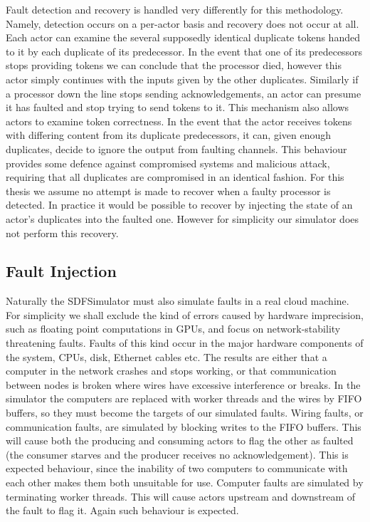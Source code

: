 Fault detection and recovery is handled very differently for this methodology.
Namely, detection occurs on a per-actor basis and recovery does not occur at all.
Each actor can examine the several supposedly identical duplicate tokens handed to it by each duplicate of its predecessor.
In the event that one of its predecessors stops providing tokens we can conclude that the processor died, however this actor simply continues with the inputs given by the other duplicates.
Similarly if a processor down the line stops sending acknowledgements, an actor can presume it has faulted and stop trying to send tokens to it.
This mechanism also allows actors to examine token correctness.
In the event that the actor receives tokens with differing content from its duplicate predecessors, it can, given enough duplicates, decide to ignore the output from faulting channels.
This behaviour provides some defence against compromised systems and malicious attack, requiring that all duplicates are compromised in an identical fashion.
For this thesis we assume no attempt is made to recover when a faulty processor is detected.
In practice it would be possible to recover by injecting the state of an actor's duplicates into the faulted one.
However for simplicity our simulator does not perform this recovery.

\subsection{Fault Injection}

Naturally the SDFSimulator must also simulate faults in a real cloud machine.
For simplicity we shall exclude the kind of errors caused by hardware imprecision, such as floating point computations in GPUs, and focus on network-stability threatening faults.
Faults of this kind occur in the major hardware components of the system, CPUs, disk, Ethernet cables etc.
The results are either that a computer in the network crashes and stops working, or that communication between nodes is broken where wires have excessive interference or breaks.
In the simulator the computers are replaced with worker threads and the wires by FIFO buffers, so they must become the targets of our simulated faults.
Wiring faults, or communication faults, are simulated by blocking writes to the FIFO buffers.
This will cause both the producing and consuming actors to flag the other as faulted (the consumer starves and the producer receives no acknowledgement).
This is expected behaviour, since the inability of two computers to communicate with each other makes them both unsuitable for use.
Computer faults are simulated by terminating worker threads.
This will cause actors upstream and downstream of the fault to flag it.
Again such behaviour is expected.

